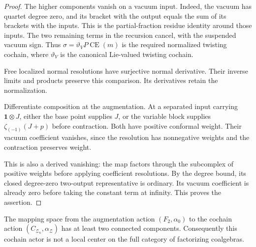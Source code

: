 \begin{proof}
The higher components vanish on a vacuum input.
Indeed, the vacuum has quartet degree zero, and its
bracket with the output equals the sum of its brackets
with the inputs. This is the partial-fraction residue
identity around those inputs. The two remaining terms
in the recursion cancel, with the suspended vacuum sign.
Thus $\sigma=\vartheta_VP\operatorname{CE}(m)$ is the
required normalized twisting cochain, where $\vartheta_V$
is the canonical Lie-valued twisting cochain.

Free localized normal resolutions have surjective normal
derivative. Their inverse limits and products preserve
this comparison. Its derivatives retain the normalization.

Differentiate composition at the augmentation.
At a separated input carrying $\mathbf1\otimes J$, either
the base point supplies $J$, or the variable block supplies
$\zeta_{(-1)}(J+p)$ before contraction.
Both have positive conformal weight. Their vacuum coefficient
vanishes, since the resolution has nonnegative weights and
the contraction preserves weight.

This is also a derived vanishing: the map factors through
the subcomplex of positive weights before applying
coefficient resolutions. By the degree bound, its closed
degree-zero two-output representative is ordinary.
Its vacuum coefficient is already zero before taking
the constant term at infinity. This proves the assertion.
\end{proof}

\begin{theorem}
\label{v4-arith:centers:thm:nonfinal}
The mapping space from the augmentation action
$(F_2,\alpha_0)$ to the cochain action
$(C_{\mathcal Z_\kappa},\alpha_{\mathcal Z})$
has at least two connected components.
Consequently this cochain actor is not a local center
on the full category of factorizing coalgebras.
\end{theorem}

